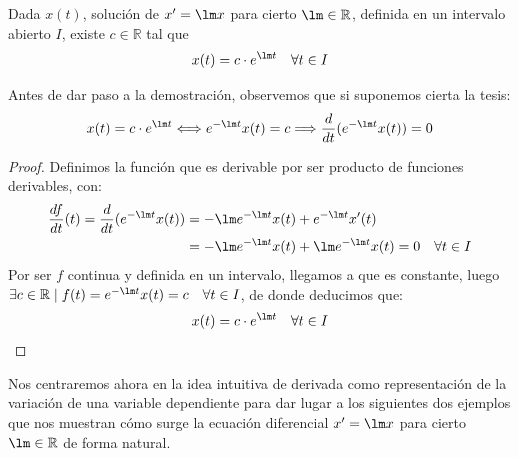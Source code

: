 \begin{prop}
    Dada $x(t)$, solución de $x'=\lm x$ para cierto $\lm \in \mathbb{R}$, definida en un intervalo abierto $I$, existe $c\in \mathbb{R}$ tal que
    \begin{equation*}
        x(t) = c \cdot e^{\lm t} \quad \forall t\in I
    \end{equation*}
\end{prop}
\noindent
Antes de dar paso a la demostración, observemos que si suponemos cierta la tesis:
\begin{equation*}
    x(t) = c \cdot e^{\lm t} \Longleftrightarrow  e^{-\lm t} x(t) = c \Longrightarrow \dfrac{d}{dt}(e^{-\lm t}x(t)) = 0
\end{equation*}
\begin{proof}
    Definimos la función
    que es derivable por ser producto de funciones derivables, con:
    \begin{align*}
        \dfrac{df}{dt}(t) = \dfrac{d}{dt}(e^{-\lm t}x(t)) &= -\lm e^{-\lm t} x(t) + e^{-\lm t} x'(t)\\
                          &= -\lm e^{-\lm t}x(t) + \lm e^{-\lm t}x(t) = 0 \quad \forall t\in I
    \end{align*}
    Por ser $f$ continua y definida en un intervalo, llegamos a que es constante, luego $\exists c\in \mathbb{R} \mid f(t) = e^{-\lm t}x(t) = c \quad \forall t\in I$, de donde deducimos que:
    \begin{equation*}
        x(t) = c \cdot e^{\lm t} \quad \forall t\in I
    \end{equation*}
\end{proof}

Nos centraremos ahora en la idea intuitiva de derivada como representación de la variación de una variable dependiente para dar lugar a los siguientes dos ejemplos que nos muestran cómo surge la ecuación diferencial $x' = \lm x$ para cierto $\lm \in \mathbb{R}$ de forma natural.

